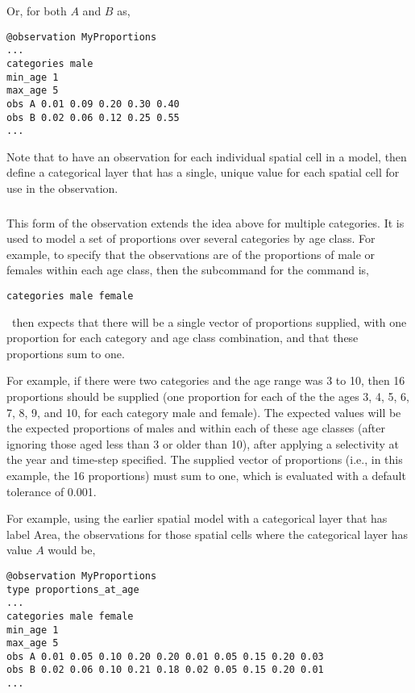 Or, for both $A$ and $B$ as,

{\small{\begin{verbatim}
@observation MyProportions
...
categories male
min_age 1
max_age 5
obs A 0.01 0.09 0.20 0.30 0.40
obs B 0.02 0.06 0.12 0.25 0.55
...
\end{verbatim}

Note that to have an observation for each individual spatial cell in a model, then define a categorical layer that has a single, unique value for each spatial cell for use in the observation. 

\subsubsection*{}

This form of the observation extends the idea above for multiple categories. It is used to model a set of proportions over several categories by age class. For example, to specify that the observations are of the proportions of male or females within each age class, then the subcommand  for the  command is,

{\small{\begin{verbatim}
categories male female
\end{verbatim}}}

\SPM\ then expects that there will be a single vector of proportions supplied, with one proportion for each category and age class combination, and that these proportions sum to one. 

For example, if there were two categories and the age range was 3 to 10, then 16 proportions should be supplied (one proportion for each of the the ages 3, 4, 5, 6, 7, 8, 9, and 10, for each category male and female). The expected values will be the expected proportions of males and within each of these age classes (after ignoring those aged less than 3 or older than 10), after applying a selectivity at the year and time-step specified. The supplied vector of proportions (i.e., in this example, the 16 proportions) must sum to one, which is evaluated with a default tolerance of 0.001. 

For example, using the earlier spatial model with a categorical layer that has label Area, the observations for those spatial cells where the categorical layer has value $A$ would be, 

{\small{\begin{verbatim}
@observation MyProportions
type proportions_at_age
...
categories male female
min_age 1
max_age 5
obs A 0.01 0.05 0.10 0.20 0.20 0.01 0.05 0.15 0.20 0.03
obs B 0.02 0.06 0.10 0.21 0.18 0.02 0.05 0.15 0.20 0.01
...
\end{verbatim}

}}}}
